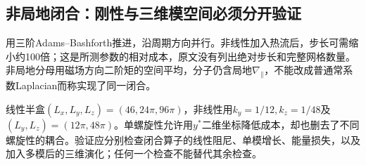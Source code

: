 \subsection{非局地闭合：刚性与三维模空间必须分开验证}
\citet{L244}用三阶Adams--Bashforth推进，沿周期方向并行。非线性加入热流后，步长可需缩小约100倍；这是所测参数的相对成本，原文没有列出绝对步长和完整网格数量。非局地分母用磁场方向二阶矩的空间平均，分子仍含局地$\nabla_\parallel$，不能改成普通常系数Laplacian而称实现了同一闭合。

线性半盒$(L_x,L_y,L_z)=(46,24\pi,96\pi)$，非线性用$k_y=1/12,k_z=1/48$及$(L_y,L_z)=(12\pi,48\pi)$。单螺旋性允许用$y^*$二维坐标降低成本，却也删去了不同螺旋性的耦合。验证应分别检查闭合算子的线性阻尼、单模增长、能量损失，以及加入多模后的三维演化；任何一个检查不能替代其余检查。
